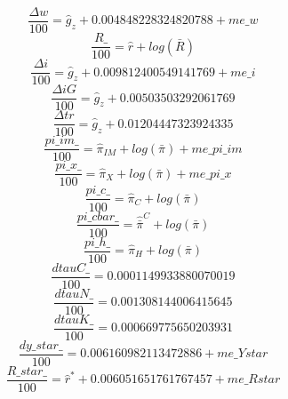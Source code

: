 \begin{dmath}
\frac{{\Delta{w}}}{100}={{\hat{g}_z}}+0.004848228324820788+{me\_w}
\end{dmath}
\begin{dmath}
\frac{{R\_}}{100}={\hat{r}}+log\left({\bar{R}}\right)
\end{dmath}
\begin{dmath}
\frac{{\Delta{i}}}{100}={{\hat{g}_z}}+0.009812400549141769+{me\_i}
\end{dmath}
\begin{dmath}
\frac{{\Delta{iG}}}{100}={{\hat{g}_z}}+0.00503503292061769
\end{dmath}
\begin{dmath}
\frac{{\Delta{tr}}}{100}={{\hat{g}_z}}+0.01204447323924335
\end{dmath}
\begin{dmath}
\frac{{pi\_im\_}}{100}={\hat{\pi}_{IM}}+log\left({\bar{\pi}}\right)+{me\_pi\_im}
\end{dmath}
\begin{dmath}
\frac{{pi\_x\_}}{100}={\hat{\pi}_{X}}+log\left({\bar{\pi}}\right)+{me\_pi\_x}
\end{dmath}
\begin{dmath}
\frac{{pi\_c\_}}{100}={\hat{\pi}_{C}}+log\left({\bar{\pi}}\right)
\end{dmath}
\begin{dmath}
\frac{{pi\_cbar\_}}{100}={\hat{\bar{\pi}}^C}+log\left({\bar{\pi}}\right)
\end{dmath}
\begin{dmath}
\frac{{pi\_h\_}}{100}={\hat{\pi}_{H}}+log\left({\bar{\pi}}\right)
\end{dmath}
\begin{dmath}
\frac{{dtauC\_}}{100}=0.0001149933880070019
\end{dmath}
\begin{dmath}
\frac{{dtauN\_}}{100}=0.001308144006415645
\end{dmath}
\begin{dmath}
\frac{{dtauK\_}}{100}=0.000669775650203931
\end{dmath}
\begin{dmath}
\frac{{dy\_star\_}}{100}=0.006160982113472886+{me\_Ystar}
\end{dmath}
\begin{dmath}
\frac{{R\_star\_}}{100}={\hat{r}^*}+0.006051651761767457+{me\_Rstar}
\end{dmath}
